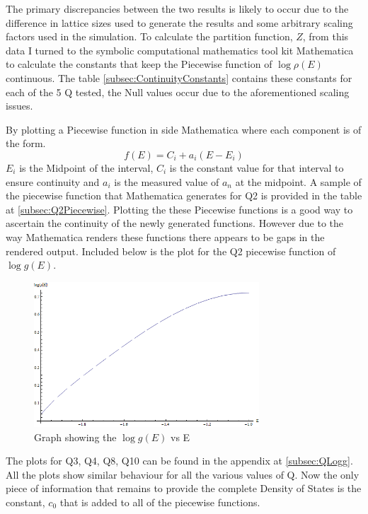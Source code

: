 The primary discrepancies between the two results is likely to occur due to the difference in lattice sizes used to generate the results and some arbitrary scaling factors used in the simulation.
To calculate the partition function, $Z$, from this data I turned to the symbolic computational mathematics tool kit Mathematica to calculate the constants that keep the Piecewise function of $\log{\rho(E)}$ continuous.
The table \ref{subsec:ContinuityConstants} contains these constants for each of the 5 Q tested, the Null values occur due to the aforementioned scaling issues.

By plotting a Piecewise function in side Mathematica where each component is of the form.
\begin{equation}
f(E) = C_i + a_i(E - E_i)
\end{equation}
$E_i$ is the Midpoint of the interval, $C_i$ is the constant value for that interval to ensure continuity and $a_i$ is the measured value of $a_n$ at the midpoint.
A sample of the piecewise function that Mathematica generates for Q2 is provided in the table at  \ref{subsec:Q2Piecewise}.
Plotting the these Piecewise functions is a good way to ascertain the continuity of the newly generated functions. However due to the way Mathematica renders these functions there appears to be gaps in the rendered output. Included below is the plot for the Q2 piecewise function of $\log{g\left(E\right)}$.
\begin{figure}[H]
\centering
\includegraphics[width=0.75\textwidth]{4-Results/Q2Log(g(E)).png}
\caption{Graph showing the $\log{g\left(E\right)}$ vs E}
\end{figure}
The plots for Q3, Q4, Q8, Q10 can be found in the appendix at \ref{subsec:QLogg}. All the plots show similar behaviour for all the various values of Q.
Now the only piece of information that remains to provide the complete Density of States is the constant, $c_0$ that is added to all of the piecewise functions.
